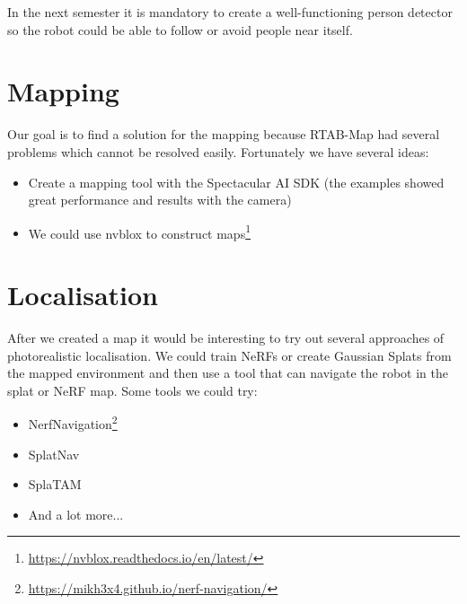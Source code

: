 In the next semester it is mandatory to create a well-functioning person detector so the robot could be able to follow or avoid people near itself.

\section{Mapping}

Our goal is to find a solution for the mapping because RTAB-Map had several problems which cannot be resolved easily. Fortunately we have several ideas:

\begin{itemize}
    \item Create a mapping tool with the Spectacular AI SDK (the examples showed great performance and results with the camera)
    \item We could use nvblox to construct maps\footnote{\url{https://nvblox.readthedocs.io/en/latest/}}
\end{itemize}

\section{Localisation}

After we created a map it would be interesting to try out several approaches of photorealistic localisation. We could train NeRFs or create Gaussian Splats from the mapped environment and then use a tool that can navigate the robot in the splat or NeRF map. Some tools we could try:
\begin{itemize}
    \item NerfNavigation\footnote{\url{https://mikh3x4.github.io/nerf-navigation/}}
    \item SplatNav\cite{splatnav}
    \item SplaTAM\cite{splatam}
    \item And a lot more...\cite{nerf_robotics_cites}
\end{itemize}
